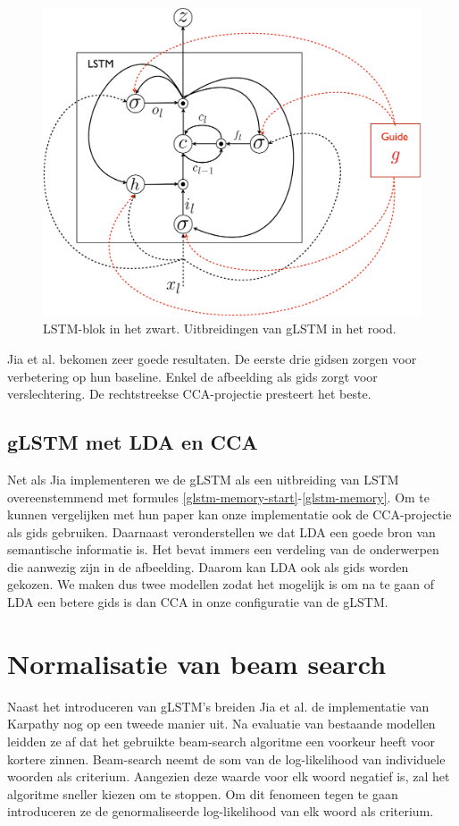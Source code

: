 \begin{figure}[tb][h]
	\centering
	\includegraphics[width=\linewidth]{Images/glstm.pdf}
	\caption{LSTM-blok in het zwart. Uitbreidingen van gLSTM in het rood.}
	\label{fig:glstm}
\end{figure}

Jia et al. bekomen zeer goede resultaten. De eerste drie gidsen zorgen voor verbetering op hun baseline. Enkel de afbeelding als gids zorgt voor verslechtering. De rechtstreekse CCA-projectie presteert het beste.

\subsection{gLSTM met LDA en CCA}
Net als Jia implementeren we de gLSTM als een uitbreiding van LSTM overeenstemmend met formules \ref{glstm-memory-start}-\ref{glstm-memory}.
Om te kunnen vergelijken met hun paper kan onze implementatie ook de CCA-projectie als gids gebruiken.
Daarnaast veronderstellen we dat LDA een goede bron van semantische informatie is. Het bevat immers een verdeling van de onderwerpen die aanwezig zijn in de afbeelding. Daarom kan LDA ook als gids worden gekozen.
We maken dus twee modellen zodat het mogelijk is om na te gaan of LDA een betere gids is dan CCA in onze configuratie van de gLSTM.

\section{Normalisatie van beam search}
Naast het introduceren van gLSTM's breiden Jia et al.  de implementatie van Karpathy nog op een tweede manier uit. Na evaluatie van bestaande modellen leidden ze af dat het gebruikte beam-search algoritme een voorkeur heeft voor kortere zinnen. Beam-search neemt de som van de log-likelihood van individuele woorden als criterium. Aangezien deze waarde voor elk woord negatief is, zal het algoritme sneller kiezen om te stoppen. Om dit fenomeen tegen te gaan introduceren ze de genormaliseerde log-likelihood van elk woord als criterium.

